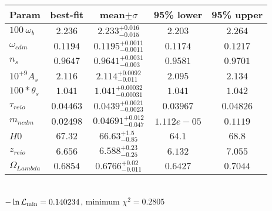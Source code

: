 \begin{tabular}{|l|c|c|c|c|} 
 \hline 
Param & best-fit & mean$\pm\sigma$ & 95\% lower & 95\% upper \\ \hline 
$100~\omega{}_{b }$ &$2.236$ & $2.233_{-0.015}^{+0.016}$ & $2.203$ & $2.264$ \\ 
$\omega{}_{cdm }$ &$0.1194$ & $0.1195_{-0.0011}^{+0.0011}$ & $0.1174$ & $0.1217$ \\ 
$n_{s }$ &$0.9647$ & $0.9641_{-0.003}^{+0.0031}$ & $0.9581$ & $0.9701$ \\ 
$10^{+9}A_{s }$ &$2.116$ & $2.114_{-0.011}^{+0.0092}$ & $2.095$ & $2.134$ \\ 
$100*\theta{}_{s }$ &$1.041$ & $1.041_{-0.00031}^{+0.00032}$ & $1.041$ & $1.042$ \\ 
$\tau{}_{reio }$ &$0.04463$ & $0.0439_{-0.0023}^{+0.0021}$ & $0.03967$ & $0.04826$ \\ 
$m_{ncdm }$ &$0.02498$ & $0.04691_{-0.047}^{+0.012}$ & $1.112e-05$ & $0.1119$ \\ 
$H0$ &$67.32$ & $66.63_{-0.85}^{+1.5}$ & $64.1$ & $68.8$ \\ 
$z_{reio }$ &$6.656$ & $6.588_{-0.25}^{+0.23}$ & $6.132$ & $7.055$ \\ 
$\Omega{}_{Lambda }$ &$0.6854$ & $0.6766_{-0.011}^{+0.02}$ & $0.6427$ & $0.7044$ \\ 
\hline 
 \end{tabular} \\ 
$-\ln{\cal L}_\mathrm{min} =0.140234$, minimum $\chi^2=0.2805$ \\ 

